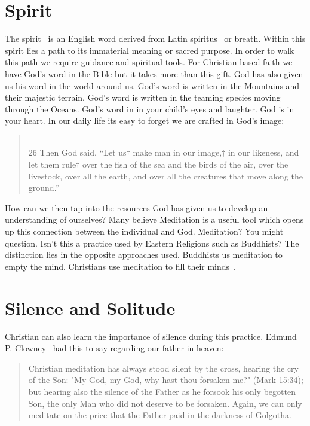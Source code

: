 \documentclass[11pt,a4paper]{scrartcl} %
\begin{document}
    \tableofcontents

\section{Spirit}
\begin{doublespace}
The spirit~\cite{wiki:000} is an English word derived from Latin spiritus~\cite{wiki:001} or breath. Within this spirit lies a path to its immaterial meaning or sacred purpose. In order to walk this path we require guidance and spiritual tools. For Christian based faith we have God's word in the Bible but it takes more than this gift. God has also given us his word in the world around us. God's word is written in the Mountains and their majestic terrain. God's word is written in the teaming species moving through the Oceans. God's word in in your child's eyes and laughter. God is in your heart. In our daily life its easy to forget we are crafted in God's image:
\end{doublespace}  
\begin{verse}
\textcolor{Maroon}{}\\
26 Then God said, “Let us† make man in our image,† in our likeness, and let them rule† over the fish of the sea and the birds of the air, over the livestock, over all the earth, and over all the creatures that move along the ground.” 
\end{verse}
\begin{doublespace}
How can we then tap into the resources God has given us to develop an understanding of ourselves? Many believe Meditation is a useful tool which opens up this connection between the individual and God. Meditation? You might question. Isn't this a practice used by Eastern Religions such as Buddhists? The distinction lies in the opposite approaches used. Buddhists us meditation to empty the mind. Christians use meditation to fill their minds~\cite{wiki:003}. 
\section{Silence and Solitude}
Christian can also learn the importance of silence during this practice. Edmund P. Clowney~\cite{clowney2002christian} had this to say regarding our father in heaven:
\end{doublespace}
\begin{quotation}
Christian meditation has always stood silent by the cross, hearing the cry of the Son: "My God, my God, why hast thou forsaken me?" (Mark 15:34); but hearing also the silence of the Father as he forsook his only begotten Son, the only Man who did not deserve to be forsaken. Again, we can only meditate on the price that the Father paid in the darkness of Golgotha.
\end{quotation}
\end{document}
